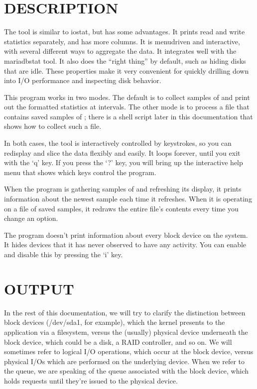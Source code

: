 \documentclass[letterpaper,10pt,english]{sphinxmanual}
\begin{document}
\section{DESCRIPTION}
\label{\detokenize{mariadb-iostat:description}}
\sphinxAtStartPar
The  tool is similar to iostat, but has some advantages. It prints
read and write statistics separately, and has more columns. It is menu\sphinxhyphen{}driven
and interactive, with several different ways to aggregate the data. It
integrates well with the mariadb\sphinxhyphen{}stat tool. It also does the “right thing” by
default, such as hiding disks that are idle.  These properties make it very
convenient for quickly drilling down into I/O performance and inspecting disk
behavior.

\sphinxAtStartPar
This program works in two modes. The default is to collect samples of
 and print out the formatted statistics at intervals. The other
mode is to process a file that contains saved samples of ; there
is a shell script later in this documentation that shows how to collect such a
file.

\sphinxAtStartPar
In both cases, the tool is interactively controlled by keystrokes, so you can
redisplay and slice the data flexibly and easily.  It loops forever, until you
exit with the ‘q’ key.  If you press the ‘?’ key, you will bring up the
interactive help menu that shows which keys control the program.

\sphinxAtStartPar
When the program is gathering samples of  and refreshing its
display, it prints information about the newest sample each time it refreshes.
When it is operating on a file of saved samples, it redraws the entire file’s
contents every time you change an option.

\sphinxAtStartPar
The program doesn’t print information about every block device on the system. It
hides devices that it has never observed to have any activity.  You can enable
and disable this by pressing the ‘i’ key.


\section{OUTPUT}
\label{\detokenize{mariadb-iostat:output}}
\sphinxAtStartPar
In the rest of this documentation, we will try to clarify the distinction
between block devices (/dev/sda1, for example), which the kernel presents to the
application via a filesystem, versus the (usually) physical device underneath
the block device, which could be a disk, a RAID controller, and so on.  We will
sometimes refer to logical I/O operations, which occur at the block device,
versus physical I/Os which are performed on the underlying device.  When we
refer to the queue, we are speaking of the queue associated with the block
device, which holds requests until they’re issued to the physical device.
\end{document}
